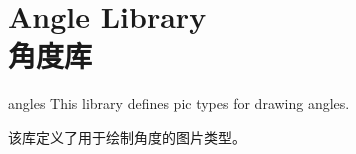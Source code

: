 \setcounter{section}{40}
\setcounter{subsection}{3}
\setcounter{subsubsection}{0}

%
%
%


\section{Angle Library\\角度库}
\label{section-angle}

\begin{tikzlibrary}{angles}
    This library defines pic types for drawing angles.

    该库定义了用于绘制角度的图片类型。


\end{tikzlibrary}

